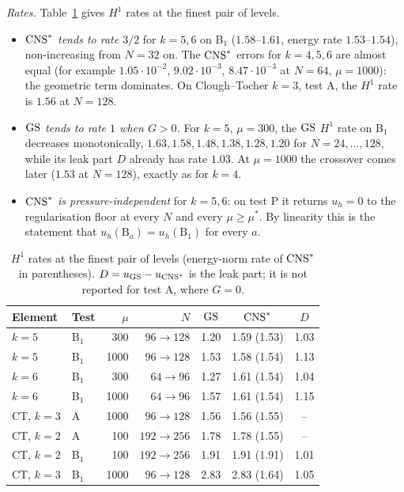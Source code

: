 \emph{Rates.} Table~\ref{tab:ratesv3} gives $H^1$ rates at the finest pair of levels.
\begin{itemize}
\item \emph{$\mathrm{CNS}^\ast$ tends to rate $3/2$} for $k=5,6$ on B$_1$ ($1.58$--$1.61$, energy rate $1.53$--$1.54$), non-increasing from $N=32$ on. The $\mathrm{CNS}^\ast$ errors for $k=4,5,6$ are almost equal (for example $1.05\cdot10^{-2}$, $9.02\cdot10^{-3}$, $8.47\cdot10^{-3}$ at $N=64$, $\mu=1000$): the geometric term dominates. On Clough--Tocher $k=3$, test A, the $H^1$ rate is $1.56$ at $N=128$.
\item \emph{$\mathrm{GS}$ tends to rate $1$ when $G>0$.} For $k=5$, $\mu=300$, the $\mathrm{GS}$ $H^1$ rate on B$_1$ decreases monotonically, $1.63,1.58,1.48,1.38,1.28,1.20$ for $N=24,\dots,128$, while its leak part $D$ already has rate $1.03$. At $\mu=1000$ the crossover comes later ($1.53$ at $N=128$), exactly as for $k=4$.
\item \emph{$\mathrm{CNS}^\ast$ is pressure-independent} for $k=5,6$: on test P it returns $u_h=0$ to the regularisation floor at every $N$ and every $\mu\ge\mu^\ast$. By linearity this is the statement that $u_h(\mathrm B_a)=u_h(\mathrm B_1)$ for every $a$.
\end{itemize}

\begin{table}[t]
\centering
\caption{$H^1$ rates at the finest pair of levels (energy-norm rate of $\mathrm{CNS}^\ast$ in parentheses). $D=u_{\mathrm{GS}}-u_{\mathrm{CNS}^\ast}$ is the leak part; it is not reported for test A, where $G=0$.}\label{tab:ratesv3}
\begin{tabular}{llrrccc}
\toprule
Element & Test & $\mu$ & $N$ & $\mathrm{GS}$ & $\mathrm{CNS}^\ast$ & $D$\\
\midrule
$k=5$ & B$_1$ & 300 & $96\to128$ & 1.20 & 1.59 (1.53) & 1.03\\
$k=5$ & B$_1$ & 1000 & $96\to128$ & 1.53 & 1.58 (1.54) & 1.13\\
$k=6$ & B$_1$ & 300 & $64\to96$ & 1.27 & 1.61 (1.54) & 1.04\\
$k=6$ & B$_1$ & 1000 & $64\to96$ & 1.57 & 1.61 (1.54) & 1.15\\
CT, $k=3$ & A & 1000 & $96\to128$ & 1.56 & 1.56 (1.55) & --\\
CT, $k=2$ & A & 100 & $192\to256$ & 1.78 & 1.78 (1.55) & --\\
CT, $k=2$ & B$_1$ & 100 & $192\to256$ & 1.91 & 1.91 (1.91) & 1.01\\
CT, $k=3$ & B$_1$ & 1000 & $96\to128$ & 2.83 & 2.83 (1.64) & 1.05\\
\bottomrule
\end{tabular}
\end{table}

